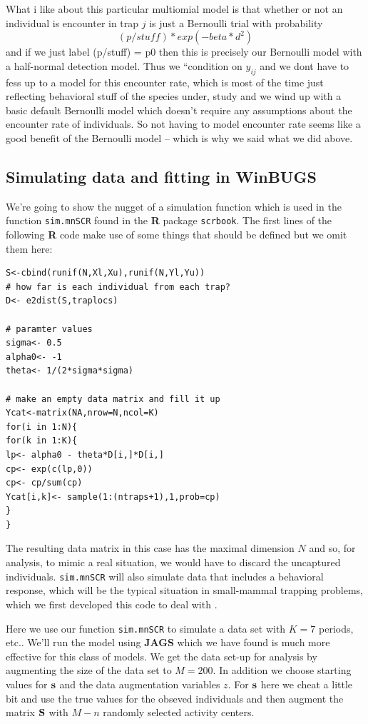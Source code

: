 {What i like about this particular multiomial model is that whether or not
an individual is encounter in trap $j$ is just a Bernoulli trial with
probability
\[ 
(p/stuff)*exp(-beta*d^2)
\]
and if we just label (p/stuff) = p0 then this is precisely our
Bernoulli model with a half-normal detection model.  Thus we ``condition
on $y_{ij}$ and we dont have to fess up to a model for this encounter
rate, which is most of the time just reflecting behavioral stuff of the
species under, study and we wind up with a basic default Bernoulli model
which doesn't require any assumptions about the encounter rate of 
individuals.  So not having to model encounter rate seems like a good
benefit of the Bernoulli model -- which is why we said what we did above.


\subsection{Simulating data and fitting in WinBUGS}

We're going to show the nugget of a simulation function which is
used in the function \mbox{\tt sim.mnSCR} found in the {\bf R} package
\mbox{\tt scrbook}.  The first lines of the following {\bf R} code
make use of some things that should be defined but we omit them here:
{\small
\begin{verbatim}
S<-cbind(runif(N,Xl,Xu),runif(N,Yl,Yu))
# how far is each individual from each trap?
D<- e2dist(S,traplocs)

# paramter values
sigma<- 0.5
alpha0<- -1
theta<- 1/(2*sigma*sigma)

# make an empty data matrix and fill it up
Ycat<-matrix(NA,nrow=N,ncol=K)
for(i in 1:N){
for(k in 1:K){
lp<- alpha0 - theta*D[i,]*D[i,]
cp<- exp(c(lp,0))
cp<- cp/sum(cp)
Ycat[i,k]<- sample(1:(ntraps+1),1,prob=cp)
}
}
\end{verbatim}
}
The resulting data matrix in this case has the maximal dimension $N$
and so, for analysis, to mimic a real situation, we would have to discard the uncaptured
individuals. 
\mbox{\tt sim.mnSCR} will also simulate data that includes a
behavioral response, which will be the typical situation in
small-mammal trapping problems, which we first developed this code to
deal with \citep[see][for details]{converse_royle:2012}.

Here we use our function \mbox{\tt sim.mnSCR} to simulate a data set
with $K=7$ periods, etc.. We'll run the model using {\bf JAGS} which we
have found is much more effective for this class of models.
We get the data set-up for analysis by augmenting the size of the data
set to $M=200$. In addition we choose starting values for ${\bf s}$ and the
data augmentation variables $z$.  For ${\bf s}$ here we cheat a little bit
and use the true values for the obseved individuals and then augment
the matrix ${\bf S}$ with $M-n$ randomly selected activity centers.

}
